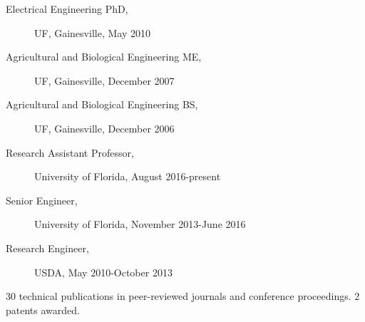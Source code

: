 


\begin{description}
\item[Electrical Engineering PhD,] UF, Gainesville, May 2010
\item[Agricultural and Biological Engineering ME,] UF, Gainesville, December 2007
\item[Agricultural and Biological Engineering BS,] UF, Gainesville, December 2006
\end{description}

\begin{description}
\item[Research Assistant Professor,] University of Florida, August 2016-present
\item[Senior Engineer,] University of Florida, November 2013-June 2016
\item[Research Engineer,] USDA,	May 2010-October 2013
\end{description}

30 technical publications in peer-reviewed journals and conference proceedings. 2 patents awarded.


